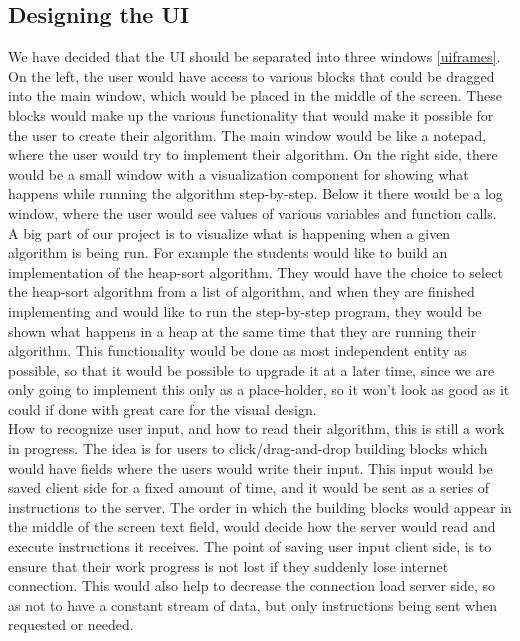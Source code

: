 \documentclass[11pt]{article}
\begin{document}
\subsection{Designing the UI}
We have decided that the UI should be separated into three windows \ref{uiframes}. On the left, the user would have access to various blocks that could be dragged into the main window, which would be placed in the middle of the screen. These blocks would make up the various functionality that would make it possible for the user to create their algorithm. The main window would be like a notepad, where the user would try to implement their algorithm. On the right side, there would be a small window with a visualization component for showing what happens while running the algorithm step-by-step. Below it there would be a log window, where the user would see values of various variables and function calls.\\


A big part of our project is to visualize what is happening when a given algorithm is being run. For example the students would like to build an implementation of the heap-sort algorithm. They would have the choice to select the heap-sort algorithm from a list of algorithm, and when they are finished implementing and would like to run the step-by-step program, they would be shown what happens in a heap at the same time that they are running their algorithm. This functionality would be done as most independent entity as possible, so that it would be possible to upgrade it at a later time, since we are only going to implement this only as a place-holder, so it won't look as good as it could if done with great care for the visual design.\\

How to recognize user input, and how to read their algorithm, this is still a work in progress. The idea is for users to click/drag-and-drop building blocks which would have fields where the users would write their input. This input would be saved client side for a fixed amount of time, and it would be sent as a series of instructions to the server. The order in which the building blocks would appear in the middle of the screen text field, would decide how the server would read and execute instructions it receives. The point of saving user input client side, is to ensure that their work progress is not lost if they suddenly lose internet connection. This would also help to decrease the connection load server side, so as not to have a constant stream of data, but only instructions being sent when requested or needed.
\end{document}
